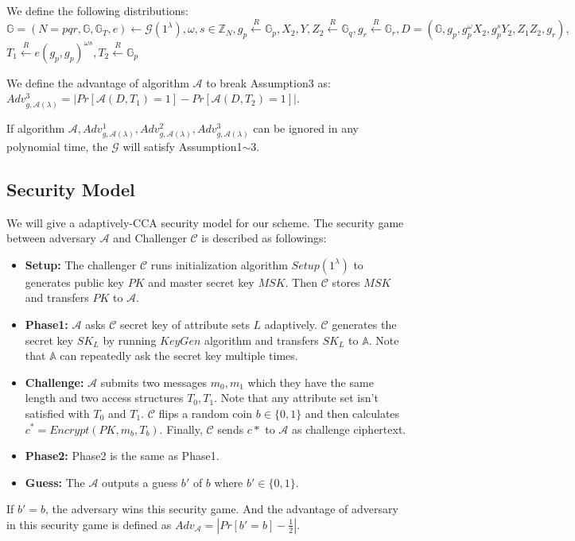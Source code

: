\documentclass[smallextended]{svjour3}       %
\begin{document}
\begin{myAssumption}\label{myAssumption3}
	We define the following distributions: \\
	$\mathbb{G}=(N=pqr,\mathbb{G},\mathbb{G}_T,e)\leftarrow\mathcal{G}(1^{\lambda}),\omega,s \in \mathbb{Z}_N, g_p\stackrel{R}{\longleftarrow}\mathbb{G}_p, X_2, Y, Z_2\stackrel{R}{\longleftarrow}\mathbb{G}_q,g_r\stackrel{R}{\longleftarrow}\mathbb{G}_r,D=(\mathbb{G},g_p,g_p^{\omega}X_2,g_p^{s}Y_2,Z_1Z_2,g_r),$\\
	$T_1\stackrel{R}{\longleftarrow}e(g_p,g_p)^{\omega s},T_2\stackrel{R}{\longleftarrow}\mathbb{G}_p$
\end{myAssumption} 
\begin{myDefinition}
	\item We define the advantage of algorithm $\mathcal{A}$ to break Assumption3 as: $Adv_{g,\mathcal{A}(\lambda)}^{3}=|Pr[\mathcal{A}(D,T_1)=1]-Pr[\mathcal{A}(D,T_2)=1]|$.
\end{myDefinition}
\begin{myDefinition}
	If algorithm $\mathcal{A},Adv_{g,\mathcal{A}(\lambda)}^{1},Adv_{g,\mathcal{A}(\lambda)}^{2},Adv_{g,\mathcal{A}(\lambda)}^{3}$ can be ignored in any polynomial time, the $\mathcal{G}$ will satisfy Assumption1$\sim$3. 
\end{myDefinition}

\subsection{Security Model}
We will give a adaptively-CCA security model for our scheme. 
The security game between adversary $\mathcal{A}$ and  Challenger $\mathcal{C}$ is described as followings:
\begin{itemize}
	\item \textbf{Setup: }The challenger $\mathcal{C}$ runs initialization algorithm $Setup(1^\lambda)$ to generates public key $PK$ and master secret key $MSK$. Then $\mathcal{C}$ stores $MSK$ and transfers $PK$ to $\mathcal{A}$.
	\item \textbf{Phase1: }$\mathcal{A}$ asks $\mathcal{C}$ secret key of attribute sets $L$ adaptively. $\mathcal{C}$ generates the secret key $SK_L$ by running $KeyGen$ algorithm and transfers $SK_L$ to $\mathbb{A}$. Note that $\mathbb{A}$ can repeatedly ask the secret key multiple times.
	\item \textbf{Challenge: }$\mathcal{A}$ submits two messages $m_0,m_1$ which they have the same length and  two access structures $T_0,T_1$. Note that any attribute set isn't satisfied with $T_0$ and $T_1$. $\mathcal{C}$ flips a random coin $b \in \{0,1\}$ and then calculates $c^*=Encrypt(PK,m_b,T_b)$. Finally, $\mathcal{C}$ sends $c*$ to $\mathcal{A}$ as challenge ciphertext.
	\item \textbf{Phase2: }Phase2 is the same as Phase1.
	\item \textbf{Guess: }The $\mathcal{A}$ outputs a guess $b'$ of $b$ where $b' \in \{0,1\}$.
\end{itemize}
If $b'=b$, the adversary wins this security game. 
And the advantage of adversary in this security game is defined as $Adv_{\mathcal{A}}=|Pr[b'=b]-\frac{1}{2}|$.
\end{document}
